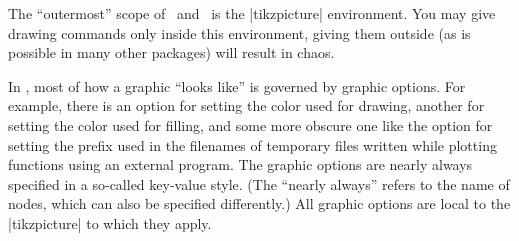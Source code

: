 The ``outermost'' scope of \pgfname\ and \tikzname\ is the |{tikzpicture}| 
environment. You may give drawing commands only inside this
environment, giving them outside (as is possible in many other
packages) will result in chaos.

In \tikzname, most of how a graphic ``looks like'' is governed by graphic
options. For example, there is an option for setting the color used
for drawing, another for setting the color used for filling, and some
more obscure one like the option  for setting the prefix used in the
filenames of temporary files written while plotting functions using an
external program. The graphic options are nearly always specified in a
so-called key-value style. (The ``nearly always'' refers to the name
of nodes, which can also be specified differently.) All graphic
options are local to the |{tikzpicture}| to which they apply.

